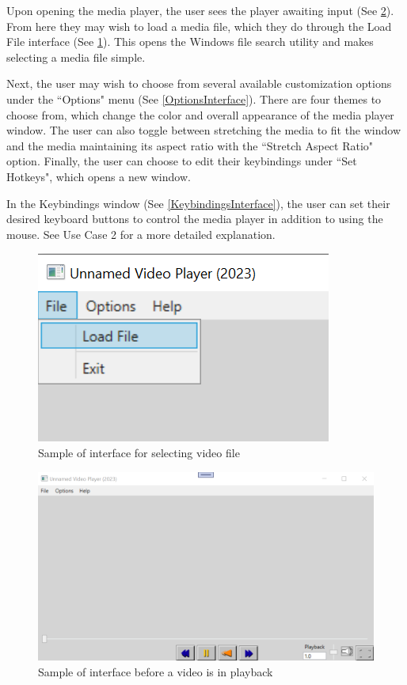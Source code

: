 \documentclass[10pt,conference,onecolumn,compsoc]{IEEEtran}
\begin{document}
Upon opening the media player, the user sees the player awaiting input (See \ref{PlayerInterface}). From here they may wish to load a media file, which they do through the Load File interface (See \ref{FileSearchInterface}). This opens the Windows file search utility and makes selecting a media file simple.\par
Next, the user may wish to choose from several available customization options under the ``Options" menu (See \ref{OptionsInterface}). There are four themes to choose from, which change the color and overall appearance of the media player window. The user can also toggle between stretching the media to fit the window and the media maintaining its aspect ratio with the ``Stretch Aspect Ratio" option. Finally, the user can choose to edit their keybindings under ``Set Hotkeys", which opens a new window. \par
In the Keybindings window (See \ref{KeybindingsInterface}), the user can set their desired keyboard buttons to control the media player in addition to using the mouse. See Use Case 2 for a more detailed explanation.

\begin{figure}[H]
\begin{center}
\includegraphics[scale=1.2]{FileSearchInterface.png}
\caption{Sample of interface for selecting video file}
\label{FileSearchInterface}
\end{center}
\end{figure}
\begin{figure}[H]
\begin{center}
\includegraphics[scale=.7]{PlayerInterface.png}
\caption{Sample of interface before a video is in playback}
\label{PlayerInterface}
\end{center}
\end{figure}
\end{document}
